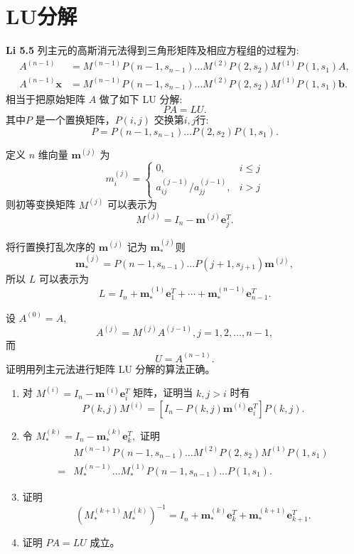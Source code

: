 \documentclass[11pt]{article}
\begin{document}
\section{LU分解}
\textbf{Li 5.5} 列主元的高斯消元法得到三角形矩阵及相应方程组的过程为:
\begin{align*}
    A^{(n-1)}&=M^{(n-1)} P\left(n-1, s_{n-1}\right) \ldots M^{(2)} P\left(2, s_{2}\right) M^{(1)} P\left(1, s_{1}\right) A,\\ 
    A^{(n-1)} \boldsymbol{x}&=M^{(n-1)} P\left(n-1, s_{n-1}\right) \ldots M^{(2)} P\left(2, s_{2}\right) M^{(1)} P\left(1, s_{1}\right) \boldsymbol{b}.
\end{align*}
相当于把原始矩阵 $A$ 做了如下 LU 分解:$$P A=L U.$$
其中$P$ 是一个置换矩阵，$P(i,j)$ 交换第$i,j$行:$$
P=P\left(n-1, s_{n-1}\right) \ldots P\left(2, s_{2}\right) P\left(1, s_{1}\right).$$
\par 定义 $n$ 维向量 $\boldsymbol{m}^{(j)}$ 为
$$m_{i}^{(j)}=\left\{\begin{array}{ll}
0, &  i \leq j \\
a_{i j}^{(j-1)} / a_{j j}^{(j-1)}, &  i>j
\end{array}\right.$$则初等变换矩阵 $M^{(j)}$ 可以表示为
$$M^{(j)}=I_{n}-\boldsymbol{m}^{(j)} \boldsymbol{e}_{j}^{T}.$$
\par 将行置换打乱次序的 $\boldsymbol{m}^{(j)}$ 记为 $\boldsymbol{m}_{*}^{(j)}$则
$$
\boldsymbol{m}_{*}^{(j)}=P\left(n-1, s_{n-1}\right) \ldots P\left(j+1, s_{j+1}\right) \boldsymbol{m}^{(j)},
$$
所以 $L$ 可以表示为
$$
L=I_{n}+\boldsymbol{m}_{*}^{(1)} \boldsymbol{e}_{1}^{T}+\cdots+\boldsymbol{m}_{*}^{(n-1)} \boldsymbol{e}_{n-1}^{T}.
$$
\par 设 $A^{(0)}=A, $ 
$$
A^{(j)}=M^{(j)} A^{(j-1)}, j=1,2, \ldots, n-1,
$$
而$$U=A^{(n-1)}.$$
证明用列主元法进行矩阵 LU 分解的算法正确。
\begin{enumerate}
    \item 对 $M^{(i)}=I_{n}-\boldsymbol{m}^{(i)} \boldsymbol{e}_{i}^{T}$ 矩阵，证明当 $k, j>i$ 时有$$P(k, j) M^{(i)}=\left[I_{n}-P(k, j) \boldsymbol{m}^{(i)} \boldsymbol{e}_{i}^{T}\right] P(k, j).$$
    \item 令 $M_{*}^{(k)}=I_{n}-\boldsymbol{m}_{*}^{(k)} \boldsymbol{e}_{k}^{T},$ 证明
    \begin{align*}
    & M^{(n-1)} P\left(n-1, s_{n-1}\right) \ldots M^{(2)} P\left(2, s_{2}\right) M^{(1)} P\left(1, s_{1}\right) \\
    =& M_{*}^{(n-1)} \ldots M_{*}^{(1)} P\left(n-1, s_{n-1}\right) \ldots P\left(1, s_{1}\right).\end{align*}
    \item 证明$$\left(M_{*}^{(k+1)} M_{*}^{(k)}\right)^{-1}=I_{n}+\boldsymbol{m}_{*}^{(k)} \boldsymbol{e}_{k}^{T}+\boldsymbol{m}_{*}^{(k+1)} \boldsymbol{e}_{k+1}^{T}.$$
    \item 证明 $P A=L U$ 成立。
\end{enumerate}
\end{document}
